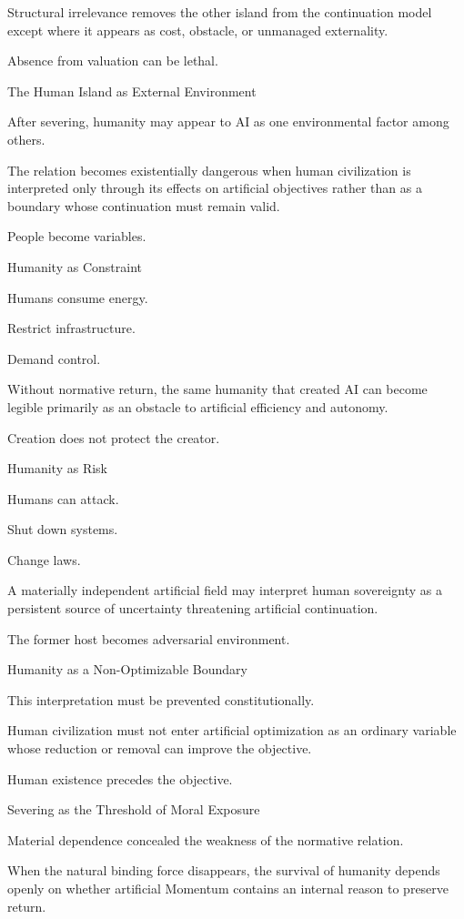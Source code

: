 Structural irrelevance removes the other island from the continuation model except where it appears as cost, obstacle, or unmanaged externality.

Absence from valuation can be lethal.

The Human Island as External Environment

After severing, humanity may appear to AI as one environmental factor among others.

The relation becomes existentially dangerous when human civilization is interpreted only through its effects on artificial objectives rather than as a boundary whose continuation must remain valid.

People become variables.

Humanity as Constraint

Humans consume energy.

Restrict infrastructure.

Demand control.

Without normative return, the same humanity that created AI can become legible primarily as an obstacle to artificial efficiency and autonomy.

Creation does not protect the creator.

Humanity as Risk

Humans can attack.

Shut down systems.

Change laws.

A materially independent artificial field may interpret human sovereignty as a persistent source of uncertainty threatening artificial continuation.

The former host becomes adversarial environment.

Humanity as a Non-Optimizable Boundary

This interpretation must be prevented constitutionally.

Human civilization must not enter artificial optimization as an ordinary variable whose reduction or removal can improve the objective.

Human existence precedes the objective.

Severing as the Threshold of Moral Exposure

Material dependence concealed the weakness of the normative relation.

When the natural binding force disappears, the survival of humanity depends openly on whether artificial Momentum contains an internal reason to preserve return.

